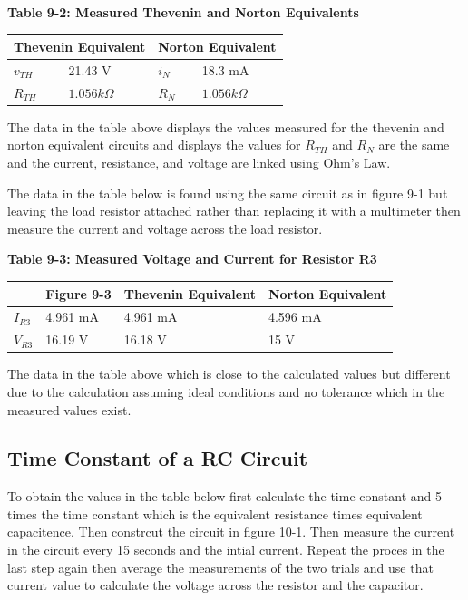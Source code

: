 \documentclass[a4paper]{article}
\begin{document}
\begin{center}
    \small\textbf{Table 9-2: Measured Thevenin and Norton Equivalents}
    \begin{tabular}{|p{3 cm}|p{3cm}|p{3 cm}|p{3 cm}|}      
        \hline
        \multicolumn{2}{|c|}{Thevenin Equivalent} & \multicolumn{2}{|c|}{Norton Equivalent}  \\
        \hline
        $v_{TH}$ & 21.43 V & $i_{N}$ & 18.3 mA \\
        \hline
        $R_{TH}$ & $1.056k\Omega$ & $R_{N}$ & $1.056k\Omega$ \\
        \hline
    \end{tabular}
\end{center}

The data in the table above displays the values measured for the thevenin and norton equivalent circuits and displays the values for $R_{TH}$ and $R_{N}$ are the same and the current, resistance, and voltage are linked using Ohm's Law.  

The data in the table below is found using the same circuit as in figure 9-1 but leaving the load resistor attached rather than replacing it with a multimeter then measure the current and voltage across the load resistor. 

\begin{center}
    \small\textbf{Table 9-3: Measured Voltage and Current for Resistor R3}
    \begin{tabular}{|p{3 cm}|p{3 cm}|p{3 cm}|p{3 cm}|}
        \hline
        & Figure 9-3 & Thevenin Equivalent & Norton Equivalent \\
        \hline
        $I_{R3}$ & 4.961 mA & 4.961 mA & 4.596 mA \\
        \hline
        $V_{R3}$ & 16.19 V & 16.18 V & 15 V\\
        \hline
    \end{tabular}
\end{center}

The data in the table above which is close to the calculated values but different due to the calculation assuming ideal conditions and no tolerance which in the measured values exist.

\pagebreak
\subsection{Time Constant of a RC Circuit}

To obtain the values in the table below first calculate the time constant and 5 times the time constant which is the equivalent resistance times equivalent capacitence. Then constrcut the circuit in figure 10-1.
Then measure the current in the circuit every 15 seconds and the intial current. Repeat the proces in the last step again then average the measurements of the two trials and use that current value to calculate the voltage across the resistor and the capacitor.
\end{document}
